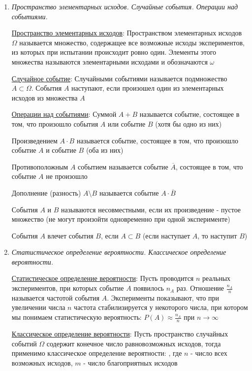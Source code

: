 \documentclass[12pt]{article}
\begin{document}
\begin{enumerate}
    \item \textit{Пространство элементарных исходов. Случайные события. Операции над событиями.}

    \hyperlink{spaceofelementaryoutcomes}{Пространство элементарных исходов}: Пространством элементарных исходов $\Omega$ называется множество, содержащее все возможные исходы
    экспериментов, из которых при испытании происходит ровно один. Элементы этого множества называются
    элементарными исходами и обозначаются $\omega$

    \hyperlink{randomeventdefinition}{Случайное событие}: Случайными событиями называется подмножество $A \subset \Omega$. События $A$ наступают, если произошел один из
    элементарных исходов из множества $A$

    \hyperlink{randomeventoperations}{Операции над событиями}: Суммой $A + B$ называется событие, состоящее в том, что произошло события $A$ или событие $B$ (хотя бы одно из них)

    Произведением $A \cdot B$ называется событие, состоящее в том, что произошло событие $A$ и событие $B$ (оба из них)

    Противоположным $A$ событием называется событие $\overline{A}$, состоящее в том, что событие $A$ не произошло

    Дополнение (разность) $A \setminus B$ называется событие $A \cdot \overline{B}$

    События $A$ и $B$ называются несовместными, если их произведение - пустое множество
    (не могут произойти одновременно при одной эксперименте)

    События $A$ влечет события $B$, если $A \subset B$ (если наступает $A$, то наступит $B$)

    \item \textit{Статистическое определение вероятности. Классическое определение вероятности.}

    \hyperlink{statisticaldefinitionofprobability}{Статистическое определение вероятности}: Пусть проводится $n$ реальных экспериментов, при которых событие $A$ появилось $n_A$ раз.
    Отношение $\frac{n_A}{n}$ называется частотой события $A$.
    Эксперименты показывают, что при увеличении числа $n$ частота стабилизируется у некоторого числа,
    при котором мы понимаем статистическую вероятность: $P(A) \approx \frac{n_A}{n}$ при $n \to \infty$

    \hyperlink{classicdefinitionofprobability}{Классическое определение вероятности}: Пусть пространство случайных событий $\Omega$ содержит конечное число равновозможных исходов,
    тогда применимо классическое определение вероятности: , где $n$ - число всех возможных исходов, $m$ - число благоприятных исходов


\end{enumerate}
\end{document}
